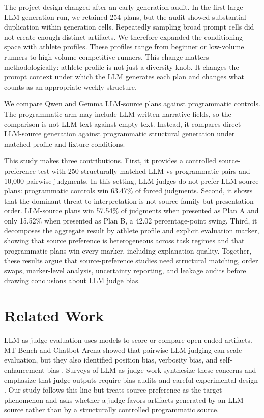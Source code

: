\documentclass[11pt]{article}
\begin{document}
The project design changed after an early generation audit. In the first large LLM-generation run, we retained 254 plans, but the audit showed substantial duplication within generation cells. Repeatedly sampling broad prompt cells did not create enough distinct artifacts. We therefore expanded the conditioning space with athlete profiles. These profiles range from beginner or low-volume runners to high-volume competitive runners. This change matters methodologically: athlete profile is not just a diversity knob. It changes the prompt context under which the LLM generates each plan and changes what counts as an appropriate weekly structure.

We compare Qwen and Gemma LLM-source plans against programmatic controls. The programmatic arm may include LLM-written narrative fields, so the comparison is not LLM text against empty text. Instead, it compares direct LLM-source generation against programmatic structural generation under matched profile and fixture conditions.

This study makes three contributions. First, it provides a controlled source-preference test with 250 structurally matched LLM-vs-programmatic pairs and 10,000 pairwise judgments. In this setting, LLM judges do not prefer LLM-source plans: programmatic controls win 63.47\% of forced judgments. Second, it shows that the dominant threat to interpretation is not source family but presentation order. LLM-source plans win 57.54\% of judgments when presented as Plan A and only 15.52\% when presented as Plan B, a 42.02 percentage-point swing. Third, it decomposes the aggregate result by athlete profile and explicit evaluation marker, showing that source preference is heterogeneous across task regimes and that programmatic plans win every marker, including explanation quality. Together, these results argue that source-preference studies need structural matching, order swaps, marker-level analysis, uncertainty reporting, and leakage audits before drawing conclusions about LLM judge bias.

\section{Related Work}

LLM-as-judge evaluation uses models to score or compare open-ended artifacts. MT-Bench and Chatbot Arena showed that pairwise LLM judging can scale evaluation, but they also identified position bias, verbosity bias, and self-enhancement bias \citep{zheng2023llmasajudge}. Surveys of LLM-as-judge work synthesize these concerns and emphasize that judge outputs require bias audits and careful experimental design \citep{gu2024language}. Our study follows this line but treats source preference as the target phenomenon and asks whether a judge favors artifacts generated by an LLM source rather than by a structurally controlled programmatic source.
\end{document}
